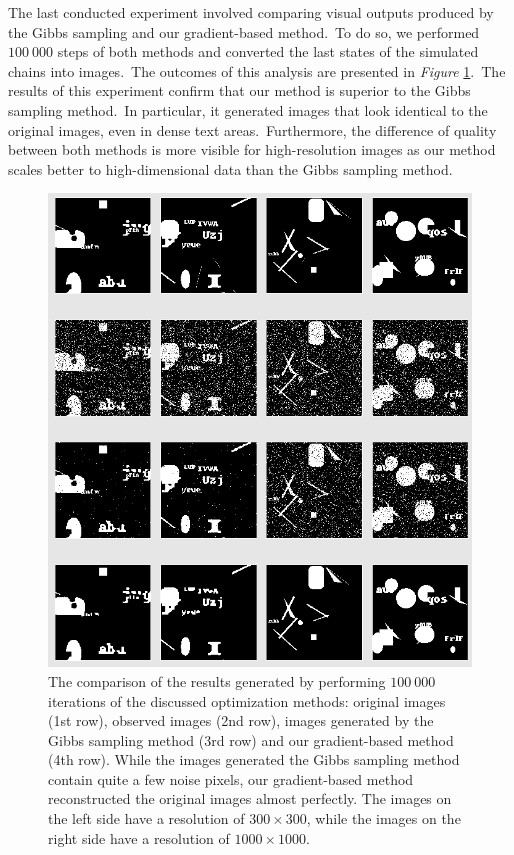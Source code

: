 \documentclass[shortabstract, english, lic]{iithesis}
\theoremstyle{default_theorem_style}\newtheorem{theorem}{Theorem}
\theoremstyle{default_theorem_style}\newtheorem{definition}{Definition}
\begin{document}
The last conducted experiment involved comparing visual outputs produced by the Gibbs sampling and our
gradient-based method.\ To do so, we performed $100\ 000$ steps of both methods and converted the last states
of the simulated chains into images.\ The outcomes of this analysis are presented in \textit{Figure}
\ref{fig:binary_qualitative_results}.\ The results of this experiment confirm that our method is superior to
the Gibbs sampling method.\ In particular, it generated images that look identical to the original images,
even in dense text areas.\ Furthermore, the difference of quality between both methods is more visible for
high-resolution images as our method scales better to high-dimensional data than the Gibbs sampling
method.\newline\newline\newline\newline\newline\newline



\begin{figure}[H]
\centering
\includegraphics[scale=0.52]{binary_qualitative_results}
\caption{The comparison of the results generated by performing $100\ 000$ iterations of the discussed optimization
methods: original images (1st row), observed images (2nd row), images generated by the Gibbs
sampling method (3rd row) and our gradient-based method (4th row). While the images generated the Gibbs sampling
method contain quite a few noise pixels, our gradient-based method reconstructed the original images almost
perfectly. The images on the left side have a resolution of $300{\times}300$, while the images on the right side
have a resolution of $1000{\times}1000$.}
\label{fig:binary_qualitative_results}
\end{figure}
\end{document}
